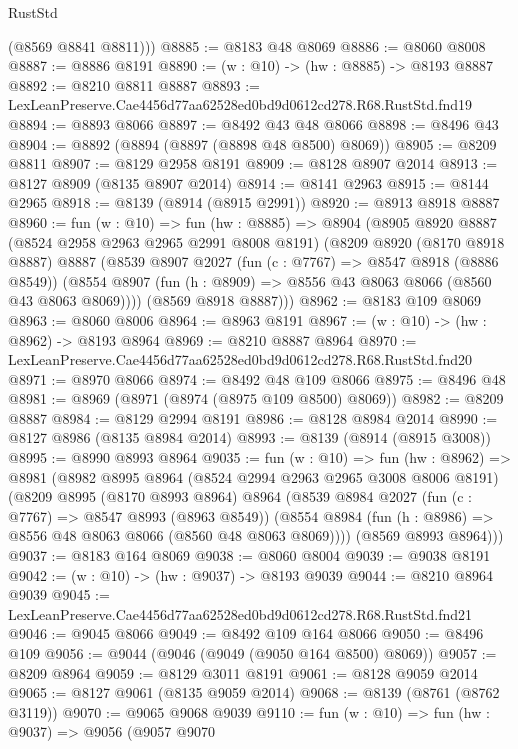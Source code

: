 \begin{lexlean}{RustStd}
\begin{coremodule}
        (@8569 @8841 @8811)))
@8885 := @8183 @48 @8069
@8886 := @8060 @8008
@8887 := @8886 @8191
@8890 := (w : @10) -> (hw : @8885) -> @8193 @8887
@8892 := @8210 @8811 @8887
@8893 := LexLeanPreserve.Cae4456d77aa62528ed0bd9d0612cd278.R68.RustStd.fnd19
@8894 := @8893 @8066
@8897 := @8492 @43 @48 @8066
@8898 := @8496 @43
@8904 := @8892 (@8894 (@8897 (@8898 @48 @8500) @8069))
@8905 := @8209 @8811
@8907 := @8129 @2958 @8191
@8909 := @8128 @8907 @2014
@8913 := @8127 @8909 (@8135 @8907 @2014)
@8914 := @8141 @2963
@8915 := @8144 @2965
@8918 := @8139 (@8914 (@8915 @2991))
@8920 := @8913 @8918 @8887
@8960 := fun (w : @10) =>
  fun (hw : @8885) =>
  @8904
    (@8905
      @8920
      @8887
      (@8524 @2958 @2963 @2965 @2991 @8008 @8191)
      (@8209
        @8920
        (@8170 @8918 @8887)
        @8887
        (@8539
          @8907
          @2027
          (fun (c : @7767) => @8547 @8918 (@8886 @8549))
          (@8554 @8907 (fun (h : @8909) => @8556 @43 @8063 @8066 (@8560 @43 @8063 @8069))))
        (@8569 @8918 @8887)))
@8962 := @8183 @109 @8069
@8963 := @8060 @8006
@8964 := @8963 @8191
@8967 := (w : @10) -> (hw : @8962) -> @8193 @8964
@8969 := @8210 @8887 @8964
@8970 := LexLeanPreserve.Cae4456d77aa62528ed0bd9d0612cd278.R68.RustStd.fnd20
@8971 := @8970 @8066
@8974 := @8492 @48 @109 @8066
@8975 := @8496 @48
@8981 := @8969 (@8971 (@8974 (@8975 @109 @8500) @8069))
@8982 := @8209 @8887
@8984 := @8129 @2994 @8191
@8986 := @8128 @8984 @2014
@8990 := @8127 @8986 (@8135 @8984 @2014)
@8993 := @8139 (@8914 (@8915 @3008))
@8995 := @8990 @8993 @8964
@9035 := fun (w : @10) =>
  fun (hw : @8962) =>
  @8981
    (@8982
      @8995
      @8964
      (@8524 @2994 @2963 @2965 @3008 @8006 @8191)
      (@8209
        @8995
        (@8170 @8993 @8964)
        @8964
        (@8539
          @8984
          @2027
          (fun (c : @7767) => @8547 @8993 (@8963 @8549))
          (@8554 @8984 (fun (h : @8986) => @8556 @48 @8063 @8066 (@8560 @48 @8063 @8069))))
        (@8569 @8993 @8964)))
@9037 := @8183 @164 @8069
@9038 := @8060 @8004
@9039 := @9038 @8191
@9042 := (w : @10) -> (hw : @9037) -> @8193 @9039
@9044 := @8210 @8964 @9039
@9045 := LexLeanPreserve.Cae4456d77aa62528ed0bd9d0612cd278.R68.RustStd.fnd21
@9046 := @9045 @8066
@9049 := @8492 @109 @164 @8066
@9050 := @8496 @109
@9056 := @9044 (@9046 (@9049 (@9050 @164 @8500) @8069))
@9057 := @8209 @8964
@9059 := @8129 @3011 @8191
@9061 := @8128 @9059 @2014
@9065 := @8127 @9061 (@8135 @9059 @2014)
@9068 := @8139 (@8761 (@8762 @3119))
@9070 := @9065 @9068 @9039
@9110 := fun (w : @10) =>
  fun (hw : @9037) =>
  @9056
    (@9057
      @9070

\end{coremodule}
\end{lexlean}
